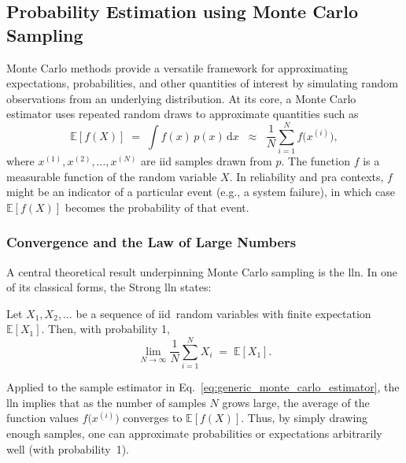 
\subsection{Probability Estimation using Monte Carlo Sampling}
Monte Carlo methods provide a versatile framework for approximating expectations, probabilities, and other quantities of interest by simulating random observations from an underlying distribution. At its core, a Monte Carlo estimator uses repeated random draws to approximate quantities such as
\begin{equation}
\label{eq:generic_monte_carlo_estimator}
\mathbb{E}[f(X)]
\;=\;
\int f(x)\,p(x)\,\mathrm{d}x
\;\;\approx\;\;
\frac{1}{N}\sum_{i=1}^N f\bigl(x^{(i)}\bigr),
\end{equation}
where \(x^{(1)},x^{(2)},\dots,x^{(N)}\) are \acrfull{iid} samples drawn from \(p\). The function \(f\) is a measurable function of the random variable \(X\). In reliability and \acrshort{pra} contexts, \(f\) might be an indicator of a particular event (e.g., a system failure), in which case \(\mathbb{E}[f(X)]\) becomes the probability of that event.

\subsubsection{Convergence and the Law of Large Numbers}
A central theoretical result underpinning Monte Carlo sampling is the \acrfull{lln}. In one of its classical forms, the Strong \acrshort{lln} states:
\begin{theorem}
\label{thm:SLLN}
Let \(X_1, X_2, \dots\) be a sequence of \acrshort{iid}\ random variables with finite expectation \(\mathbb{E}[X_1]\). Then, with probability 1,
\[
\lim_{N\to\infty}
\frac{1}{N}\sum_{i=1}^N X_i
\;=\;
\mathbb{E}[X_1].
\]
\end{theorem}
Applied to the sample estimator in Eq.~\eqref{eq:generic_monte_carlo_estimator}, the \acrshort{lln} implies that as the number of samples \(N\) grows large, the average of the function values \(f\bigl(x^{(i)}\bigr)\) converges to \(\mathbb{E}[f(X)]\). Thus, by simply drawing enough samples, one can approximate probabilities or expectations arbitrarily well (with probability~1).

